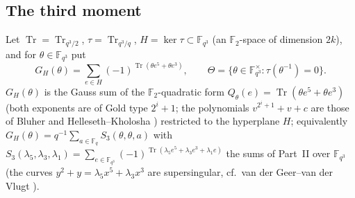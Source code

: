 \documentclass[12pt,a4paper]{amsart}
\theoremstyle{definition}
\newcommand{\F}{\mathbb{F}}
\newcommand{\Tr}{\operatorname{Tr}}
\begin{document}
\subsection{The third moment}
Let $\Tr=\Tr_{q^3/2}$, $\tau=\Tr_{q^3/q}$, $H=\ker\tau\subset\F_{q^3}$ (an $\F_2$-space of dimension $2k$), and for $\theta\in\F_{q^3}$ put
\[
G_H(\theta)=\sum_{e\in H}(-1)^{\Tr(\theta e^5+\theta e^3)},\qquad \Theta=\{\theta\in\F_{q^3}^\times:\tau(\theta^{-1})=0\}.
\]
$G_H(\theta)$ is the Gauss sum of the $\F_2$-quadratic form $Q_\theta(e)=\Tr(\theta e^5+\theta e^3)$ (both exponents are of Gold type $2^i+1$; the polynomials $v^{2^i+1}+v+c$ are those of Bluher \cite{Bluher} and Helleseth--Kholosha \cite{HellesethKholosha}) restricted to the hyperplane $H$; equivalently $G_H(\theta)=q^{-1}\sum_{a\in\F_q}S_3(\theta,\theta,a)$ with $S_3(\lambda_5,\lambda_3,\lambda_1)=\sum_{e\in\F_{q^3}}(-1)^{\Tr(\lambda_5e^5+\lambda_3e^3+\lambda_1e)}$ the sums of Part~II over $\F_{q^3}$ (the curves $y^2+y=\lambda_5x^5+\lambda_3x^3$ are supersingular, cf.\ van der Geer--van der Vlugt \cite{vdGvdV}).
\end{document}
